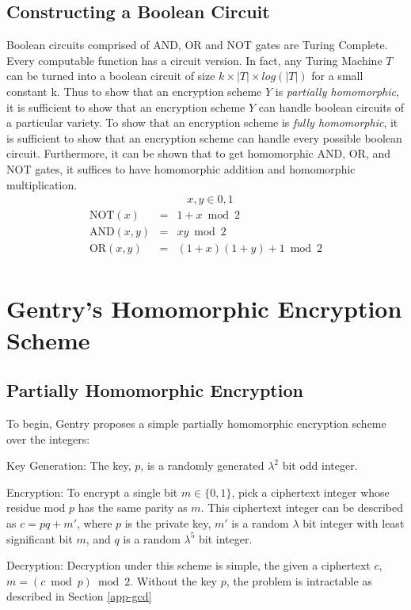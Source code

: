 \documentclass[a4paper,10pt]{article}
\begin{document}
\subsection{Constructing a Boolean Circuit}
Boolean circuits comprised of AND, OR and NOT gates are Turing
Complete. Every computable function has a circuit version. In fact,
any Turing Machine $T$ can be turned into a boolean circuit of size $k
\times |T| \times log(|T|)$ for a small constant k. Thus to show that
an encryption scheme $Y$ is \textit{partially homomorphic}, it is
sufficient to show that an encryption scheme $Y$ can handle boolean
circuits of a particular variety. To show that an encryption scheme is
\textit{fully homomorphic}, it is sufficient to show that an
encryption scheme can handle every possible boolean
circuit. Furthermore, it can be shown that to get homomorphic AND, OR,
and NOT gates, it suffices to have homomorphic addition and
homomorphic multiplication.
\begin{eqnarray*}
\label{aoi}
&x,y \in {0,1}
\end{eqnarray*}
\begin{eqnarray*}
\mathrm{NOT}(x) &=& 1+x \bmod 2\\
\mathrm{AND}(x,y) &=& xy \bmod 2\\
\mathrm{OR}(x,y) &=& (1+x)(1+y) + 1 \bmod 2\\
\end{eqnarray*}

\section{Gentry's Homomorphic Encryption Scheme}

\subsection{Partially Homomorphic Encryption}
To begin, Gentry proposes a simple partially homomorphic encryption
scheme over the integers:

Key Generation: The key, $p$, is a randomly generated $\lambda^2$ bit
odd integer.

Encryption: To encrypt a single bit $ m \in \{0,1\} $, pick a
ciphertext integer whose residue mod $ p $ has the same parity as
$m$. This ciphertext integer can be described as $ c = pq + m' $,
where $ p $ is the private key, $m'$ is a random $\lambda$ bit integer
with least significant bit $m$, and $q$ is a random $\lambda^5$ bit
integer.

Decryption: Decryption under this scheme is simple, the given a
ciphertext $c$, $ m = ( c \bmod p) \bmod 2 $. Without the key $p$, the
problem is intractable as described in Section \ref{app-gcd}
\end{document}
